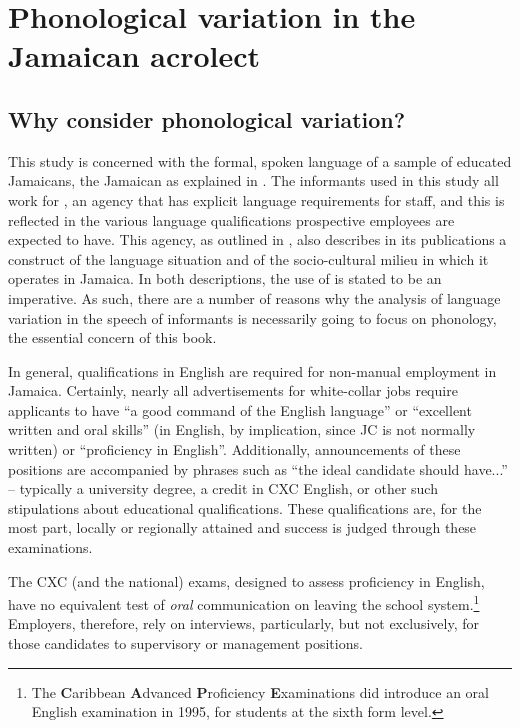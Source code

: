 \chapter{Phonological variation in the Jamaican acrolect}\label{ch:2}
\section{Why consider phonological variation?}%

This study is concerned with the formal, spoken language of a sample of educated Jamaicans, the Jamaican  as explained in .  The informants used in this study all work for , an agency that has explicit language requirements for staff, and this is reflected in the various language qualifications prospective employees are expected to have.  This agency, as outlined in , also describes in its publications a construct of the language situation and of the socio-cultural milieu in which it operates in Jamaica.  In both descriptions, the use of  is stated to be an imperative.  As such, there are a number of reasons why the analysis of language variation in the speech of  informants is necessarily going to focus on phonology, the essential concern of this book. 

      In general, qualifications in English are required for non-manual employment in Jamaica. Certainly, nearly all advertisements for white-collar jobs require applicants to have “a good command of the English language” or “excellent written and oral skills” (in English, by implication, since JC is not normally written) or “proficiency in English”.  Additionally, announcements of these positions are accompanied by phrases such as “the ideal candidate should have...” – typically a university degree, a credit in CXC English, or other such stipulations about educational qualifications.  These qualifications are, for the most part, locally or regionally attained and success is judged through these examinations.  

 The CXC (and the national) exams, designed to assess proficiency in English, have no equivalent test of \textit{oral} communication on leaving the school system.\footnote{The \textbf{C}aribbean \textbf{A}dvanced \textbf{P}roficiency \textbf{E}xaminations did introduce an oral English examination in 1995, for students at the sixth form level.}   Employers, therefore, rely on interviews, particularly, but not exclusively, for those candidates to supervisory or management positions.  

